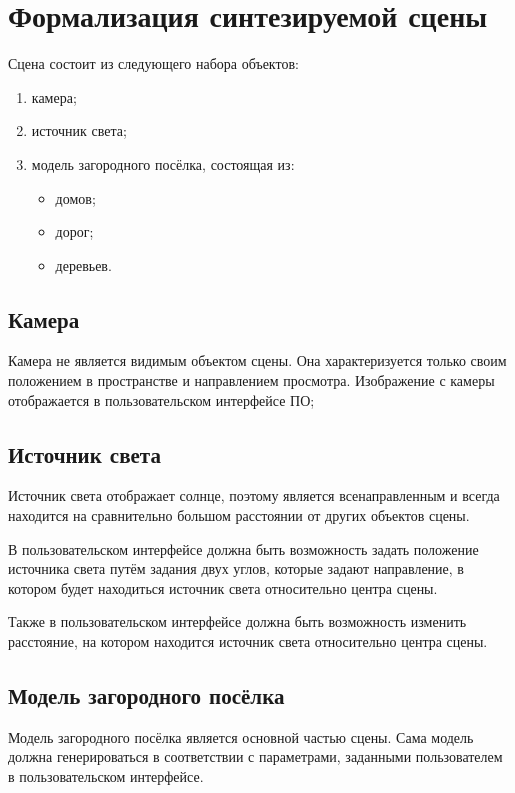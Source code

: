 
\section{Формализация синтезируемой сцены}

Сцена состоит из следующего набора объектов:
\begin{enumerate}
    \item камера;
    \item источник света;
    \item модель загородного посёлка, состоящая из: 
    \begin{itemize}
        \item домов;
        \item дорог;
        \item деревьев.
    \end{itemize}
\end{enumerate}

\subsection*{Камера}

Камера не является видимым объектом сцены. Она характеризуется только своим положением в пространстве и направлением просмотра. Изображение с камеры отображается в пользовательском интерфейсе ПО;

\subsection*{Источник света}

Источник света отображает солнце, поэтому является всенаправленным и всегда находится на сравнительно большом расстоянии от других объектов сцены.

В пользовательском интерфейсе должна быть возможность задать положение источника света путём задания двух углов, которые задают направление, в котором будет находиться источник света относительно центра сцены. 

Также в пользовательском интерфейсе должна быть возможность изменить расстояние, на котором находится источник света относительно центра сцены.

\subsection*{Модель загородного посёлка}

Модель загородного посёлка является основной частью сцены. Сама модель должна генерироваться в соответствии с параметрами, заданными пользователем в пользовательском интерфейсе.

